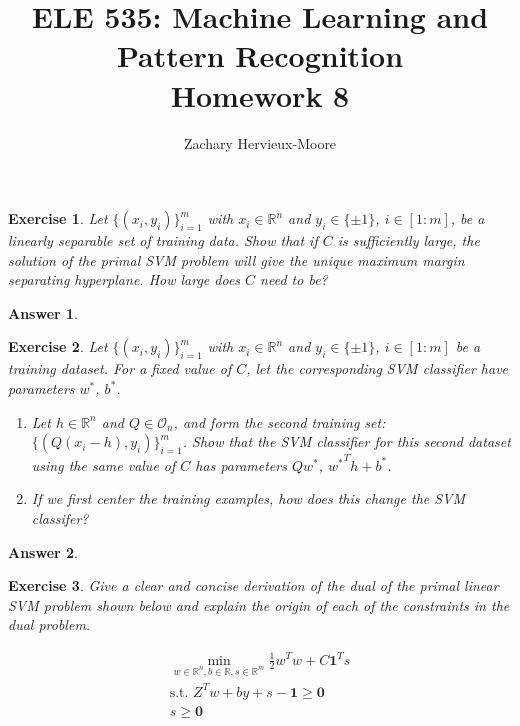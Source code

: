 \documentclass[12pt]{article}
\title{ELE 535: Machine Learning and Pattern Recognition \\ Homework 8}
\author{Zachary Hervieux-Moore}
\date{\displaydate{date}}
\theoremstyle{colon}
\newtheorem{exercise}{Exercise}
\newtheorem*{answer}{Answer}
\begin{document}
\maketitle

\clearpage

\begin{exercise}
  Let $\{(x_i, y_i)\}_{i=1}^m$ with $x_i \in \mathbb{R}^n$ and $y_i \in \{\pm 1\}$, $i \in [1:m]$, be a linearly separable set of training data. Show that if $C$ is sufficiently large, the solution of the primal SVM problem will give the unique maximum margin separating hyperplane. How large does $C$ need to be?
\end{exercise}

\begin{answer}

\end{answer}

\clearpage

\begin{exercise}
  Let $\{(x_i, y_i)\}_{i=1}^m$ with $x_i \in \mathbb{R}^n$ and $y_i \in \{\pm 1\}$, $i \in [1:m]$ be a training dataset. For a fixed value of $C$, let the corresponding SVM classifier have parameters $w^*$, $b^*$.

  \begin{enumerate}[label=\alph*)]
    \item Let $h \in \mathbb{R}^n$ and $Q \in \mathcal{O}_n$, and form the second training set: $\{(Q(x_i - h), y_i) \}_{i=1}^m$. Show that the SVM classifier for this second dataset using the same value of $C$ has parameters $Q w^*$, ${w^*}^T h + b^*$.

    \item If we first center the training examples, how does this change the SVM classifer?
  \end{enumerate}
\end{exercise}

\begin{answer}

\end{answer}

\clearpage

\begin{exercise}
  Give a clear and concise derivation of the dual of the primal linear SVM problem shown below and explain the origin of each of the constraints in the dual problem.

  \begin{gather*}
    \min_{w \in \mathbb{R}^n, b \in \mathbb{R}, s \in \mathbb{R}^m} \frac{1}{2} w^T w + C \bm{1}^T s \\
    \text{s.t. } Z^T w + b y + s - \bm{1} \geq \bm{0} \\
    s \geq \bm{0}
  \end{gather*}
\end{exercise}
\end{document}
